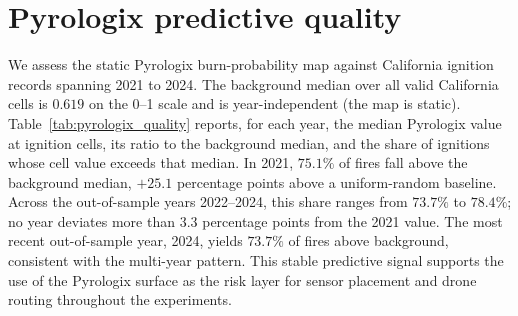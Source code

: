 \section{Pyrologix predictive quality}
\label{app:pyrologix_quality}
We assess the static Pyrologix burn-probability map \cite{pyrologix} against California
ignition records spanning 2021 to 2024. The background median over all valid California
cells is $0.619$ on the 0--1 scale and is year-independent (the map is static).
Table~\ref{tab:pyrologix_quality} reports, for each year, the median Pyrologix value at
ignition cells, its ratio to the background median, and the share of ignitions whose cell
value exceeds that median. In 2021, $75.1\%$ of fires fall above the
background median, $+25.1$ percentage points above a uniform-random baseline. Across the
out-of-sample years 2022--2024, this share ranges from $73.7\%$ to $78.4\%$; no year
deviates more than $3.3$ percentage points from the 2021 value. The most recent
out-of-sample year, 2024, yields $73.7\%$ of fires above background, consistent with
the multi-year pattern. This stable predictive signal supports the use of the Pyrologix
surface as the risk layer for sensor placement and drone routing throughout the
experiments.

